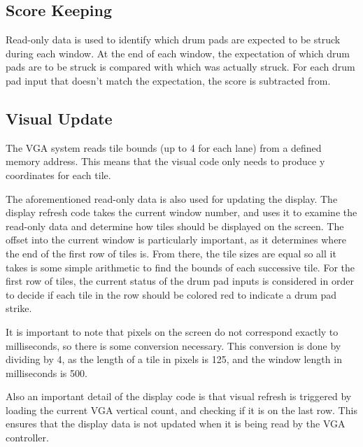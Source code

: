 \documentclass{subfile}
\begin{document}
  \subsection{Score Keeping}
  Read-only data is used to identify which drum pads are expected to be struck during each 
  window.
  At the end of each window, the expectation of which drum pads are to be struck is 
  compared with which was actually struck. 
  For each drum pad input that doesn't match the expectation, the score is subtracted 
  from.

  \subsection{Visual Update}
  The VGA system reads tile bounds (up to 4 for each lane) from a defined memory address. 
  This means that the visual code only needs to produce y coordinates for each tile.

  The aforementioned read-only data is also used for updating the display.
  The display refresh code takes the current window number, and uses it to examine the read-only 
  data and determine how tiles should be displayed on the screen. 
  The offset into the current window is particularly important, as it determines where the end 
  of the first row of tiles is.
  From there, the tile sizes are equal so all it takes is some simple arithmetic to find the 
  bounds of each successive tile.
  For the first row of tiles, the current status of the drum pad inputs is considered in 
  order to decide if each tile in the row should be colored red to indicate a drum pad strike.
  
  It is important to note that pixels on the screen do not correspond exactly to milliseconds, 
  so there is some conversion necessary. 
  This conversion is done by dividing by 4, as the length of a tile in pixels is 125, and 
  the window length in milliseconds is 500.

  Also an important detail of the display code is that visual refresh is triggered by loading 
  the current VGA vertical count, and checking if it is on the last row. 
  This ensures that the display data is not updated when it is being read by the VGA controller.
\end{document}
